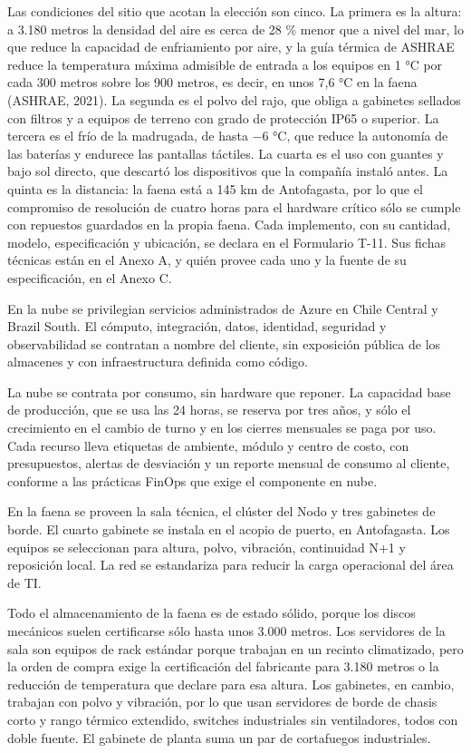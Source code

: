 \documentclass[subdoc]{../../comun/overfore}
\begin{document}
Las condiciones del sitio que acotan la elección son cinco. La primera es la altura: a 3.180 metros la densidad del aire es cerca de 28 \% menor que a nivel del mar, lo que reduce la capacidad de enfriamiento por aire, y la guía térmica de ASHRAE reduce la temperatura máxima admisible de entrada a los equipos en 1 °C por cada 300 metros sobre los 900 metros, es decir, en unos 7,6 °C en la faena (ASHRAE, 2021). La segunda es el polvo del rajo, que obliga a gabinetes sellados con filtros y a equipos de terreno con grado de protección IP65 o superior. La tercera es el frío de la madrugada, de hasta −6 °C, que reduce la autonomía de las baterías y endurece las pantallas táctiles. La cuarta es el uso con guantes y bajo sol directo, que descartó los dispositivos que la compañía instaló antes. La quinta es la distancia: la faena está a 145 km de Antofagasta, por lo que el compromiso de resolución de cuatro horas para el hardware crítico sólo se cumple con repuestos guardados en la propia faena. Cada implemento, con su cantidad, modelo, especificación y ubicación, se declara en el Formulario T-11. Sus fichas técnicas están en el Anexo A, y quién provee cada uno y la fuente de su especificación, en el Anexo C.

En la nube se privilegian servicios administrados de Azure en Chile Central y Brazil South. El cómputo, integración, datos, identidad, seguridad y observabilidad se contratan a nombre del cliente, sin exposición pública de los almacenes y con infraestructura definida como código.

La nube se contrata por consumo, sin hardware que reponer. La capacidad base de producción, que se usa las 24 horas, se reserva por tres años, y sólo el crecimiento en el cambio de turno y en los cierres mensuales se paga por uso. Cada recurso lleva etiquetas de ambiente, módulo y centro de costo, con presupuestos, alertas de desviación y un reporte mensual de consumo al cliente, conforme a las prácticas FinOps que exige el componente en nube.

En la faena se proveen la sala técnica, el clúster del Nodo y tres gabinetes de borde. El cuarto gabinete se instala en el acopio de puerto, en Antofagasta. Los equipos se seleccionan para altura, polvo, vibración, continuidad N+1 y reposición local. La red se estandariza para reducir la carga operacional del área de TI.

Todo el almacenamiento de la faena es de estado sólido, porque los discos mecánicos suelen certificarse sólo hasta unos 3.000 metros. Los servidores de la sala son equipos de rack estándar porque trabajan en un recinto climatizado, pero la orden de compra exige la certificación del fabricante para 3.180 metros o la reducción de temperatura que declare para esa altura. Los gabinetes, en cambio, trabajan con polvo y vibración, por lo que usan servidores de borde de chasis corto y rango térmico extendido, switches industriales sin ventiladores, todos con doble fuente. El gabinete de planta suma un par de cortafuegos industriales.
\end{document}
